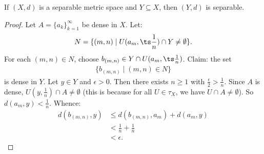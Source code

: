     \begin{proposition}
        If $(X,d)$ is a separable metric space and $Y \subseteq X$, then $(Y,d)$ is separable.
    \end{proposition}
        \begin{proof}
            Let $A = \{a_k\}_{k = 1}^\infty$ be dense in $X$. Let:
                \begin{equation*}
                \begin{split}
                    N = \{(m,n) \mid U(a_m,{\ts \frac{1}{n}}) \cap Y \neq \emptyset \}.
                \end{split}
                \end{equation*}
            For each $(m,n) \in N$, choose $b_{(m,n)} \in Y \cap U(a_m,{\ts \frac{1}{n}})$. Claim: the set
                \begin{equation*}
                \begin{split}
                    \{b_{(m,n)} \mid (m,n) \in N\}
                \end{split}
                \end{equation*}
            is dense in $Y$. Let $y \in Y$ and $\epsilon > 0$. Then there exists $n \geq 1$ with $\frac{\epsilon}{2} > \frac{1}{n}$. Since $A$ is dense, $U(y,\frac{1}{n}) \cap A \neq \emptyset$ (this is because for all $U \in \tau_X$, we have $U \cap A \neq \emptyset$). So $d(a_m, y) < \frac{1}{n}$. Whence:
                \begin{equation*}
                \begin{split}
                    d(b_{(m,n)},y)
                    & \leq d(b_{(m,n)},a_m) +  d(a_m,y) \\
                    & < \frac{1}{n} + \frac{1}{n} \\
                    & < \epsilon.
                \end{split}
                \end{equation*}
        \end{proof}

